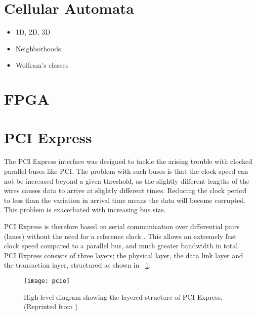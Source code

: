 \section{Cellular Automata}

\TODO

\begin{itemize}
    \item 1D, 2D, 3D
    \item Neighborhoods
    \item Wolfram's classes
\end{itemize}

\section{FPGA}

\TODO

\section{PCI Express}

The PCI Express interface was designed to tackle the arising trouble with clocked parallel buses like PCI.
The problem with such buses is that the clock speed can not be increased beyond a given threshold, as the slightly different lengths of the wires causes data to arrive at slightly different times.
Reducing the clock period to less than the variation in arrival time means the data will become corrupted.
This problem is exacerbated with increasing bus size.

PCI Express is therefore based on serial communication over differential pairs (lanes\footnotemark) without the need for a reference clock \cite{pcie}.
This allows an extremely fast clock speed compared to a parallel bus, and much greater bandwidth in total.
PCI Express consists of three layers; the physical layer, the data link layer and the transaction layer, structured as shown in \figurename~\ref{fig:pcie}.

\begin{figure}[!ht]
    \centering
    \texttt{[image: pcie]}
    \caption[PCI Express structure]{
        High-level diagram showing the layered structure of PCI Express. (Reprinted from \cite{pcie})
    }
    \label{fig:pcie}
\end{figure}

